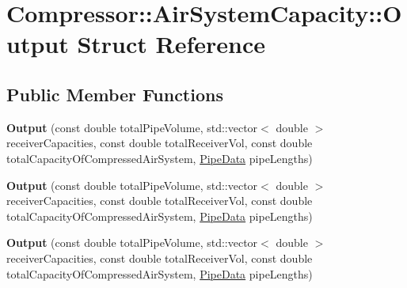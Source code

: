 \hypertarget{struct_compressor_1_1_air_system_capacity_1_1_output}{}\section{Compressor\+:\+:Air\+System\+Capacity\+:\+:Output Struct Reference}
\label{struct_compressor_1_1_air_system_capacity_1_1_output}
\subsection*{Public Member Functions}
\begin{DoxyCompactItemize}
\item 
\mbox{\label{struct_compressor_1_1_air_system_capacity_1_1_output_ab4065e716b526f38cc310fcec579afde}} 
{\bfseries Output} (const double total\+Pipe\+Volume, std\+::vector$<$ double $>$ receiver\+Capacities, const double total\+Receiver\+Vol, const double total\+Capacity\+Of\+Compressed\+Air\+System, \hyperlink{struct_compressor_1_1_pipe_data}{Pipe\+Data} pipe\+Lengths)
\item 
\mbox{\label{struct_compressor_1_1_air_system_capacity_1_1_output_ab4065e716b526f38cc310fcec579afde}} 
{\bfseries Output} (const double total\+Pipe\+Volume, std\+::vector$<$ double $>$ receiver\+Capacities, const double total\+Receiver\+Vol, const double total\+Capacity\+Of\+Compressed\+Air\+System, \hyperlink{struct_compressor_1_1_pipe_data}{Pipe\+Data} pipe\+Lengths)
\item 
\mbox{\label{struct_compressor_1_1_air_system_capacity_1_1_output_ab4065e716b526f38cc310fcec579afde}} 
{\bfseries Output} (const double total\+Pipe\+Volume, std\+::vector$<$ double $>$ receiver\+Capacities, const double total\+Receiver\+Vol, const double total\+Capacity\+Of\+Compressed\+Air\+System, \hyperlink{struct_compressor_1_1_pipe_data}{Pipe\+Data} pipe\+Lengths)
\end{DoxyCompactItemize}
